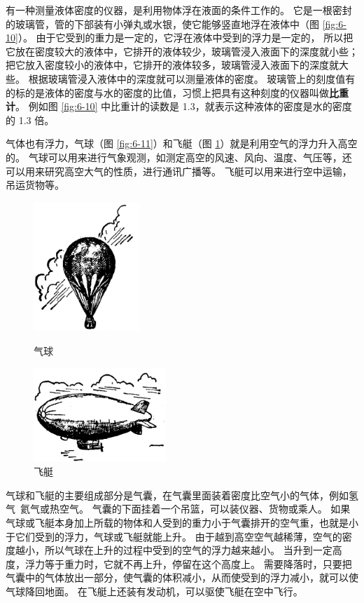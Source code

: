 有一种测量液体密度的仪器，是利用物体浮在液面的条件工作的。
它是一根密封的玻璃管，管的下部装有小弹丸或水银，使它能够竖直地浮在液体中（图 \ref{fig:6-10}）。
由于它受到的重力是一定的，它浮在液体中受到的浮力是一定的，
所以把它放在密度较大的液体中，它排开的液体较少，玻璃管浸入液面下的深度就小些；
把它放入密度较小的液体中，它排开的液体较多，玻璃管浸入液面下的深度就大些。
根据玻璃管浸入液体中的深度就可以测量液体的密度。
玻璃管上的刻度值有的标的是液体的密度与水的密度的比值，习惯上把具有这种刻度的仪器叫做\textbf{比重计}。
例如图 \ref{fig:6-10} 中比重计的读数是 1.3，就表示这种液体的密度是水的密度的 1.3 倍。

气体也有浮力，气球（图 \ref{fig:6-11}）和飞艇（图 \ref{fig:6-12}）就是利用空气的浮力升入高空的。
气球可以用来进行气象观测，如测定高空的风速、风向、温度、气压等，还可以用来研究高空大气的性质，进行通讯广播等。
飞艇可以用来进行空中运输，吊运货物等。


\begin{figure}[htbp]
    \centering
    \begin{minipage}{7cm}
    \centering
    \includegraphics[width=4cm]{../pic/czwl1-ch6-11}
    \caption{气球}\label{fig:6-11}
    \end{minipage}
    \qquad
    \begin{minipage}{7cm}
    \centering
    \includegraphics[width=5cm]{../pic/czwl1-ch6-12}
    \caption{飞艇}\label{fig:6-12}
    \end{minipage}
\end{figure}

气球和飞艇的主要组成部分是气囊，在气囊里面装着密度比空气小的气体，例如氢气\ 氦气或热空气。
气囊的下面挂着一个吊篮，可以装仪器、货物或乘人。
如果气球或飞艇本身加上所载的物体和人受到的重力小于气囊排开的空气重，也就是小于它们受到的浮力，气球或飞艇就能上升。
由于越到高空空气越稀薄，空气的密度越小，所以气球在上升的过程中受到的空气的浮力越来越小。
当升到一定高度，浮力等于重力时，它就不再上升，停留在这个高度上。
需要降落时，只要把气囊中的气体放出一部分，使气囊的体积减小，从而使受到的浮力减小，就可以使气球降回地面。
在飞艇上还装有发动机，可以驱使飞艇在空中飞行。



